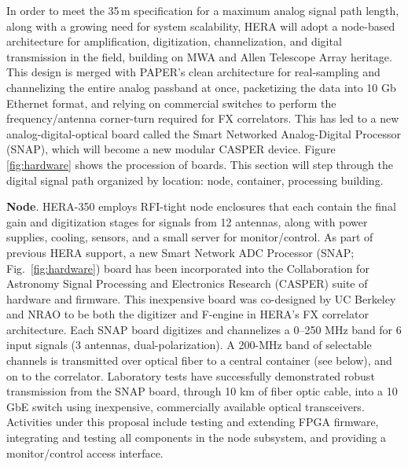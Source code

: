 \documentclass[preprint,11pt]{aastex}
\begin{document}
In order to meet the 35\,m specification for a maximum analog signal path length, along with a growing need for system scalability, HERA will adopt a node-based architecture for amplification, digitization, channelization, and digital
transmission in the field, building on MWA and Allen Telescope Array heritage. This design is merged with PAPER's clean 
architecture for real-sampling and channelizing the entire analog passband at once, packetizing the data into
10 Gb Ethernet format, and relying on commercial switches to perform the frequency/antenna corner-turn required for FX correlators.  This has led to a new analog-digital-optical board called the Smart Networked Analog-Digital Processor (SNAP), which will become a new modular CASPER device.  Figure \ref{fig:hardware} shows the procession of boards.  This section will step through the digital signal path organized by location:  node, container, processing building.

{\bf Node}. HERA-350 employs RFI-tight node enclosures that each contain the final gain and digitization stages for
signals from 12 antennas, along with power supplies, cooling, sensors, and a small server for monitor/control.  
As part of previous HERA support,
a new Smart Network ADC Processor (SNAP; Fig.~\ref{fig:hardware}) board has been incorporated 
into the Collaboration for Astronomy Signal Processing and Electronics Research (CASPER) suite of hardware and firmware. This inexpensive board was co-designed by UC Berkeley and NRAO to be
both the digitizer and F-engine in HERA's FX correlator architecture.
Each SNAP board 
digitizes and channelizes a 0--250 MHz band for 6 input signals (3 antennas, dual-polarization).
A 200-MHz band of selectable channels is transmitted over optical fiber
to a central container (see below), and on to the correlator.  Laboratory
tests have successfully demonstrated robust transmission from the SNAP board, through 10 km of fiber optic cable, 
into a 10 GbE switch using inexpensive, commercially available optical transceivers.
Activities under this proposal include 
testing and extending FPGA firmware,
integrating and testing all components in the node subsystem, and providing a monitor/control
access interface.
\end{document}
